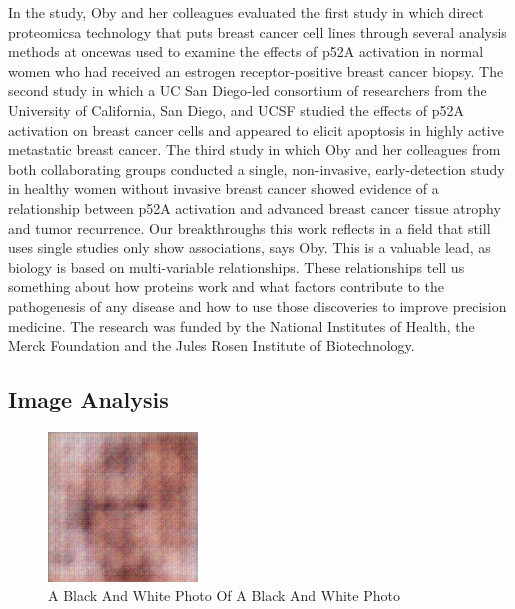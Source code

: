 \documentclass{article}%
\begin{document}
In the study, Oby and her colleagues evaluated the first study in which direct proteomicsa technology that puts breast cancer cell lines through several analysis methods at oncewas used to examine the effects of p52A activation in normal women who had received an estrogen receptor{-}positive breast cancer biopsy. The second study in which a UC San Diego{-}led consortium of researchers from the University of California, San Diego, and UCSF studied the effects of p52A activation on breast cancer cells and appeared to elicit apoptosis in highly active metastatic breast cancer. The third study in which Oby and her colleagues from both collaborating groups conducted a single, non{-}invasive, early{-}detection study in healthy women without invasive breast cancer showed evidence of a relationship between p52A activation and advanced breast cancer tissue atrophy and tumor recurrence.\newline%
Our breakthroughs this work reflects in a field that still uses single studies only show associations, says Oby. This is a valuable lead, as biology is based on multi{-}variable relationships. These relationships tell us something about how proteins work and what factors contribute to the pathogenesis of any disease and how to use those discoveries to improve precision medicine.\newline%
The research was funded by the National Institutes of Health, the Merck Foundation and the Jules Rosen Institute of Biotechnology.

%
\subsection{Image Analysis}%
\label{subsec:ImageAnalysis}%


\begin{figure}[h!]%
\centering%
\includegraphics[width=150px]{500_fake_images/samples_5_128.png}%
\caption{A Black And White Photo Of A Black And White Photo}%
\end{figure}

%
\end{document}
